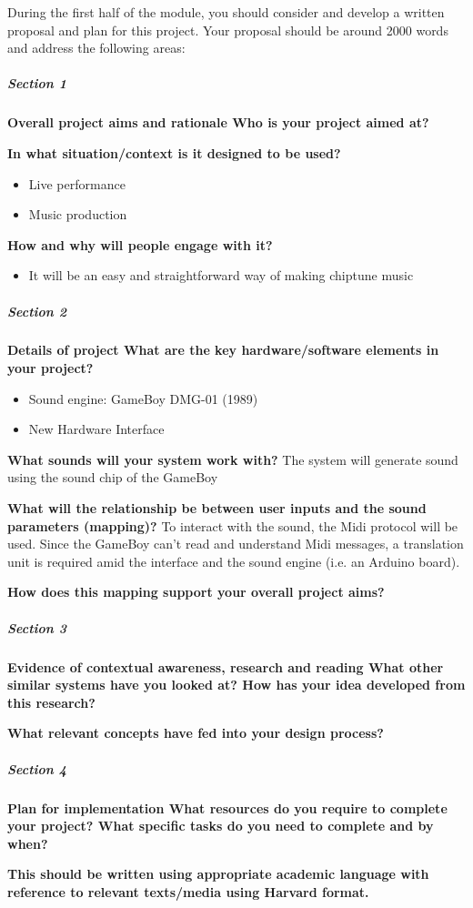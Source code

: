 \documentclass[]{article}
\begin{document}
During the first half of the module, you should consider and develop a 
written proposal and plan for this project. Your proposal should be around 
2000 words and address the following areas:

\subparagraph[]{Section 1}
    \textbf{Overall project aims and rationale Who is your project aimed at?}

    \textbf{In what situation/context is it designed to be used?}
    
        \begin{itemize}
        \item Live performance
        \item Music production
        \end{itemize}

    \textbf{How and why will people engage with it?}

        \begin{itemize}
        \item It will be an easy and straightforward way of making chiptune music
        \end{itemize}

\subparagraph[]{Section 2}

    \textbf{Details of project What are the key hardware/software elements in your
    project?}

        \begin{itemize}
            \item Sound engine: GameBoy DMG-01 (1989)
            \item New Hardware Interface
        \end{itemize}

    \textbf{What sounds will your system work with?}
    The system will generate sound using the sound chip of the GameBoy

    \textbf{What will the relationship be between user inputs and the sound 
    parameters (mapping)?} 
    To interact with the sound, the Midi protocol will be used.
    Since the GameBoy can't read and understand Midi messages,
    a translation unit is required amid the interface and the sound engine (i.e. an Arduino board).

    \textbf{How does this mapping support your overall project aims?}

\subparagraph[]{Section 3}

    \textbf{Evidence of contextual awareness, research and reading What other similar
    systems have you looked at? How has your idea developed from this research? }
    
    \textbf{What relevant concepts have fed into your design process?}

\subparagraph[]{Section 4}
    
    \textbf{Plan for implementation What resources do you require to complete your
    project? What specific tasks do you need to complete and by when?}

    \textbf{This should be written using appropriate academic language with reference
    to relevant texts/media using Harvard format.}



\end{document}

